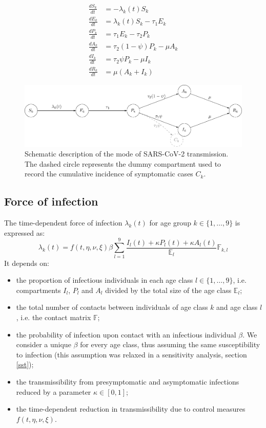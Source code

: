 \documentclass{article}
\begin{document}
	\begin{align}
		\frac{dS_k}{dt} &= - \lambda_k(t)S_k \\
		\frac{dE_k}{dt} &= \lambda_k(t)S_k - \tau_1 E_k \\
		\frac{dP_k}{dt} &= \tau_1 E_k - \tau_2 P_k \\
		\frac{dA_k}{dt} &= \tau_2(1-\psi) P_k - \mu A_k \\
		\frac{dI_k}{dt} &= \tau_2\psi P_k - \mu I_k \\
		\frac{dR_k}{dt} &= \mu (A_k + I_k) 
	\end{align}
	

\begin{figure}[H]
	\centering
	\includegraphics[width=.9\linewidth]{../format_output/figures/fig_ode.pdf}
	\caption{Schematic description of the mode of SARS-CoV-2 transmission. The dashed circle represents the dummy compartment used to record the cumulative incidence of symptomatic cases $C_k$.}
	\label{fig:ode}
\end{figure}

	\subsection{Force of infection}

		The time-dependent force of infection $\lambda_k(t)$ for age group $k \in \{1,\ldots,9\}$ is expressed as:
\begin{equation}
\lambda_k(t) = f(t,\eta,\nu, \xi) \beta \sum_{l=1}^9  \dfrac{I_l(t) + \kappa P_l(t) + \kappa A_l(t)}{\mathds{E}_l}  \mathds{F}_{k,l} 
\end{equation}
	It depends on:
	\begin{itemize}
		\item the proportion of infectious individuals in each age class $l \in \{1,\ldots,9\}$, i.e. compartments $I_l$, $P_l$ and $A_l$ divided by the total size of the age class $\mathds{E}_l$;
		\item the total number of contacts between individuals of age class $k$ and age class $l$, i.e. the contact matrix $\mathds{F}$;
		\item the probability of infection upon contact with an infectious individual $\beta$. We consider a unique $\beta$ for every age class, thus assuming the same susceptibility to infection (this assumption was relaxed in a sensitivity analysis, section \ref{sst});
		\item the transmissibility from presymptomatic and asymptomatic infections reduced by a parameter $\kappa \in [0,1]$;
		\item the time-dependent reduction in transmissibility due to control measures $f(t, \eta,\nu,\xi)$.
	\end{itemize}
\end{document}

